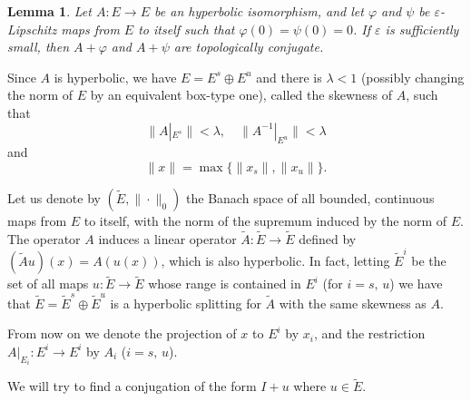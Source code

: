 \documentclass[12pt]{article}
\newtheorem{lemma}{Lemma}
\renewcommand{\phi}{\varphi}
\renewcommand{\epsilon}{\varepsilon}
\begin{document}
\begin{lemma}
Let $A\colon E\to E$ be an hyperbolic isomorphism, and let $\phi$ and $\psi$
be $\epsilon$-Lipschitz maps from $E$ to itself such that $\phi(0)=\psi(0)=0$.
If $\epsilon$ is sufficiently small, then $A+\phi$ and $A+\psi$ are topologically conjugate.
\end{lemma}

Since $A$ is hyperbolic, we have $E=E^s \oplus E^u$ and there is $\lambda < 1$
(possibly changing the norm of $E$ by an equivalent box-type one), called the skewness of $A$,
 such that $$\|A|_{E^s}\|<\lambda, \quad \|A^{-1}|_{E^u}\|<\lambda$$ and
$$\|x\| = \max\{\|x_s\|,\|x_u\|\}.$$

Let us denote by $(\tilde E,\|\cdot\|_0)$ the Banach space of all bounded, continuous maps from $E$
to itself, with the norm of the supremum induced by the norm of $E$.
The operator $A$ induces a linear operator $\tilde A:\tilde E\to \tilde E$ defined by
$(\tilde Au)(x) = A(u(x))$, which is also hyperbolic. In fact, letting
$\tilde E^i$ be the set of all maps $u\colon \tilde E\to \tilde E$ whose range is contained
in $E^i$ (for $i= s,\,u$) we have that $\tilde E = \tilde E^s\oplus \tilde E^u$ is a hyperbolic splitting
for $\tilde A$ with the same skewness as $A$.

From now on we denote the projection of $x$ to $E^i$ by $x_i$, and
the restriction $A|_{E_i}\colon E^i\to E^i$ by $A_i$ ($i=s,\,u$).

We will try to find a conjugation of the form $I+u$ where $u\in \tilde E$.
\end{document}
